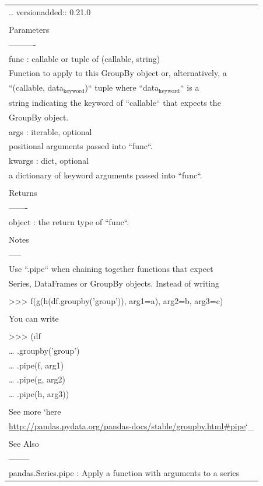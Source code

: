 \documentclass[11pt]{article}
\begin{document}
\begin{enumerate}
\begin{enumerate}
\begin{enumerate}
\begin{center}
\begin{tabular}{l}
\\
.. versionadded:: 0.21.0\\
\\
Parameters\\
----------\\
func : callable or tuple of (callable, string)\\
Function to apply to this GroupBy object or, alternatively, a\\
``(callable, data\(_{\text{keyword}}\))`` tuple where ``data\(_{\text{keyword}}\)`` is a\\
string indicating the keyword of ``callable`` that expects the\\
GroupBy object.\\
args : iterable, optional\\
positional arguments passed into ``func``.\\
kwargs : dict, optional\\
a dictionary of keyword arguments passed into ``func``.\\
\\
Returns\\
-------\\
object : the return type of ``func``.\\
\\
Notes\\
-----\\
Use ``.pipe`` when chaining together functions that expect\\
Series, DataFrames or GroupBy objects. Instead of writing\\
\\
>>> f(g(h(df.groupby('group')), arg1=a), arg2=b, arg3=c)\\
\\
You can write\\
\\
>>> (df\\
\ldots{}    .groupby('group')\\
\ldots{}    .pipe(f, arg1)\\
\ldots{}    .pipe(g, arg2)\\
\ldots{}    .pipe(h, arg3))\\
\\
See more `here\\
\url{http://pandas.pydata.org/pandas-docs/stable/groupby.html\#pipe}`\_\\
\\
See Also\\
--------\\
pandas.Series.pipe : Apply a function with arguments to a series\\

\end{tabular}
\end{center}
\end{enumerate}
\end{enumerate}
\end{enumerate}
\end{document}
